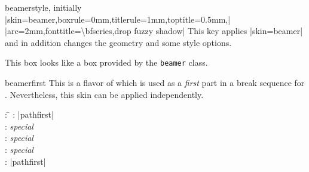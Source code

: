 \begin{docTcbKey}{beamer}{}{style, initially\\
  |skin=beamer,boxrule=0mm,titlerule=1mm,toptitle=0.5mm,|\\
  |arc=2mm,fonttitle=\textbackslash bfseries,drop fuzzy shadow|
}
  This key applies |skin=beamer| and in addition changes the geometry and some style options.
\end{docTcbKey}



\begin{dispExample}
\end{dispExample}



\begin{dispExample}
\begin{tcolorbox}[beamer,colback=Salmon!50!white,colframe=FireBrick!75!black,
  adjusted title=A colored box with the \enquote{beamer} skin]
This box looks like a box provided by the \texttt{beamer} class.
\end{tcolorbox}
\end{dispExample}


\begin{dispExample}
\begin{tcolorbox}[beamer,colframe=blue,colback=black,
  watermark graphics=lichtspiel.jpg,
  coltext=white,watermark opacity=0.75,watermark stretch=1.0,
  title=Beamer Box with background picture]
\lipsum[1]
\end{tcolorbox}
\end{dispExample}




\clearpage
\begin{docSkin}{beamerfirst}
This is a flavor of  which is used as a \emph{first} part
in a break sequence for .
Nevertheless, this skin can be applied independently.
\begin{tcolorbox}[skintable=beamerfirst]
  \begin{tabbing}
    : \=\kill
    :           \> |pathfirst|\\
    : \> \emph{special}\\ 
    :        \> \emph{special}\\
    :    \> \emph{special}\\
    :           \> |pathfirst|
  \end{tabbing}
\end{tcolorbox}
\end{docSkin}


